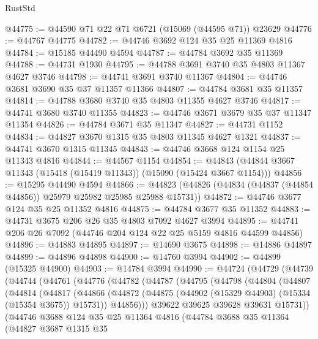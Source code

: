 \begin{lexlean}{RustStd}
\begin{coremodule}
@44775 := @44590 @71 @22 @71 @6721 (@15069 (@44595 @71)) @23629
@44776 := @44767 @44775
@44782 := @44746 @3692 @124 @35 @25 @11369 @4816
@44784 := @15185 @44490 @4594
@44787 := @44784 @3692 @35 @11369
@44788 := @44731 @1930
@44795 := @44788 @3691 @3740 @35 @4803 @11367 @4627 @3746
@44798 := @44741 @3691 @3740 @11367
@44804 := @44746 @3681 @3690 @35 @37 @11357 @11366
@44807 := @44784 @3681 @35 @11357
@44814 := @44788 @3680 @3740 @35 @4803 @11355 @4627 @3746
@44817 := @44741 @3680 @3740 @11355
@44823 := @44746 @3671 @3679 @35 @37 @11347 @11354
@44826 := @44784 @3671 @35 @11347
@44827 := @44731 @1152
@44834 := @44827 @3670 @1315 @35 @4803 @11345 @4627 @1321
@44837 := @44741 @3670 @1315 @11345
@44843 := @44746 @3668 @124 @1154 @25 @11343 @4816
@44844 := @44567 @1154
@44854 := @44843 (@44844 @3667 @11343 (@15418 (@15419 @11343)) (@15090 (@15424 @3667 @1154)))
@44856 := @15295 @44490 @4594
@44866 := @44823 (@44826 (@44834 (@44837 (@44854 @44856)) @25979 @25982 @25985 @25988 @15731))
@44872 := @44746 @3677 @124 @35 @25 @11352 @4816
@44875 := @44784 @3677 @35 @11352
@44883 := @44731 @3675 @206 @26 @35 @4803 @7092 @4627 @3994
@44895 := @44741 @206 @26 @7092 (@44746 @204 @124 @22 @25 @5159 @4816 @44599 @44856)
@44896 := @44883 @44895
@44897 := @14690 @3675
@44898 := @14886 @44897
@44899 := @44896 @44898
@44900 := @14760 @3994
@44902 := @44899 (@15325 @44900)
@44903 := @14784 @3994
@44990 := @44724
    (@44729
      (@44739
        (@44744
          (@44761
            (@44776
              (@44782
                (@44787
                  (@44795
                    (@44798
                      (@44804
                        (@44807
                          (@44814
                            (@44817
                              (@44866
                                (@44872
                                  (@44875 (@44902 (@15329 @44903) (@15334 (@15354 @3675)) @15731))
                                  @44856)))
                            @39622
                            @39625
                            @39628
                            @39631
                            @15731))
                        (@44746
                          @3688
                          @124
                          @35
                          @25
                          @11364
                          @4816
                          (@44784
                            @3688
                            @35
                            @11364
                            (@44827
                              @3687
                              @1315
                              @35

\end{coremodule}
\end{lexlean}
